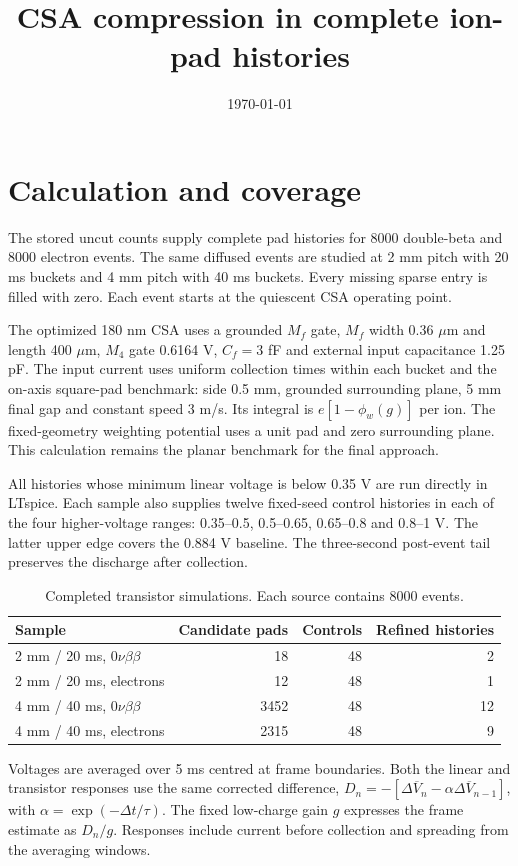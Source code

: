 \documentclass[11pt,a4paper]{article}
\title{CSA compression in complete ion-pad histories}
\date{\today}
\begin{document}
\maketitle
\section{Calculation and coverage}
The stored uncut counts supply complete pad histories for 8000 double-beta and
8000 electron events. The same diffused events are studied at 2 mm pitch with
20 ms buckets and 4 mm pitch with 40 ms buckets. Every missing sparse entry is
filled with zero. Each event starts at the quiescent CSA operating point.

The optimized 180 nm CSA uses a grounded $M_f$ gate, $M_f$ width 0.36 $\mu$m and
length 400 $\mu$m, $M_4$ gate 0.6164 V, $C_f=3$ fF and external input
capacitance 1.25 pF. The input current uses uniform collection times within each
bucket and the on-axis square-pad benchmark: side 0.5 mm, grounded surrounding
plane, 5 mm final gap and constant speed 3 m/s. Its integral is
$e[1-\phi_w(g)]$ per ion. The fixed-geometry weighting potential uses a unit pad
and zero surrounding plane. This calculation remains the planar benchmark for
the final approach.

All histories whose minimum linear voltage is below 0.35 V are run directly
in LTspice. Each sample also supplies twelve fixed-seed control histories in
each of the four higher-voltage ranges: 0.35--0.5, 0.5--0.65, 0.65--0.8 and
0.8--1 V. The latter upper edge covers the 0.884 V baseline. The three-second
post-event tail preserves the discharge after collection.

\begin{table}[ht]\centering
\begin{tabular}{lrrr}\toprule
Sample & Candidate pads & Controls & Refined histories\\\midrule
2 mm / 20 ms, $0\nu\beta\beta$ & 18 & 48 & 2 \\
2 mm / 20 ms, electrons & 12 & 48 & 1 \\
4 mm / 40 ms, $0\nu\beta\beta$ & 3452 & 48 & 12 \\
4 mm / 40 ms, electrons & 2315 & 48 & 9 \\
\bottomrule\end{tabular}
\caption{Completed transistor simulations. Each source contains 8000 events.}
\end{table}

Voltages are averaged over 5 ms centred at frame boundaries. Both the linear
and transistor responses use the same corrected difference,
$D_n=-[\Delta\overline V_n-\alpha\Delta\overline V_{n-1}]$, with
$\alpha=\exp(-\Delta t/\tau)$. The fixed low-charge gain $g$ expresses the
frame estimate as $D_n/g$. Responses include current before collection and
spreading from the averaging windows.
\end{document}
